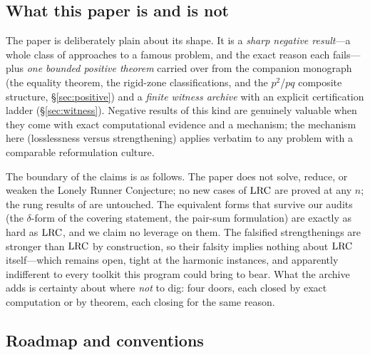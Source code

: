 \subsection{What this paper is and is not}

The paper is deliberately plain about its shape. It is a \emph{sharp
negative result}---a whole class of approaches to a famous problem, and
the exact reason each fails---plus \emph{one bounded positive theorem}
carried over from the companion monograph (the equality theorem, the
rigid-zone classifications, and the $p^2$/$pq$ composite structure,
\S\ref{sec:positive}) and a \emph{finite witness archive} with an explicit
certification ladder (\S\ref{sec:witness}). Negative results of this kind
are genuinely valuable when they come with exact computational evidence
and a mechanism; the mechanism here (losslessness versus strengthening)
applies verbatim to any problem with a comparable reformulation culture.

The boundary of the claims is as follows. The paper does not solve,
reduce, or weaken the Lonely Runner Conjecture; no new cases of $\mathrm{LRC}$
are proved at any $n$; the rung results of
\cite{Rosenfeld8,Trakulthongchai,Sungkawichai,Allikvere} are untouched.
The equivalent forms that survive our audits (the $\delta$-form of the
covering statement, the pair-sum formulation) are exactly as hard as
$\mathrm{LRC}$, and we claim no leverage on them. The falsified strengthenings
are stronger than $\mathrm{LRC}$ by construction, so their falsity implies
nothing about $\mathrm{LRC}$ itself---which remains open, tight at the harmonic
instances, and apparently indifferent to every toolkit this program could
bring to bear. What the archive adds is certainty about where \emph{not}
to dig: four doors, each closed by exact computation or by theorem, each
closing for the same reason.

\subsection{Roadmap and conventions}

